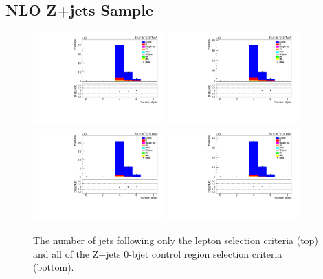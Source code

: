 \clearpage
\newpage
\subsection{NLO Z+jets Sample}

\begin{figure}[ht]
\centering
\includegraphics[width=0.45\textwidth]{figs/background-estimation/plots/unblinded/DY_control_old_prompt_ee_DYamcatnlo/numbJets_SingleTop_jetSel_ee.pdf}
\includegraphics[width=0.45\textwidth]{figs/background-estimation/plots/unblinded/DY_control_old_prompt_mumu_DYamcatnlo/numbJets_SingleTop_jetSel_mumu.pdf}
\\
\includegraphics[width=0.45\textwidth]{figs/background-estimation/plots/unblinded/DY_control_old_prompt_ee_DYamcatnlo/numbJets_SingleTop_wMass_ee.pdf}
\includegraphics[width=0.45\textwidth]{figs/background-estimation/plots/unblinded/DY_control_old_prompt_mumu_DYamcatnlo/numbJets_SingleTop_wMass_mumu.pdf}
\caption{
The number of jets following only the lepton selection criteria (top) and all of the Z+jets 0-bjet control region selection criteria (bottom).
}
\label{fig:CR_NLO_nJets}
\end{figure}

